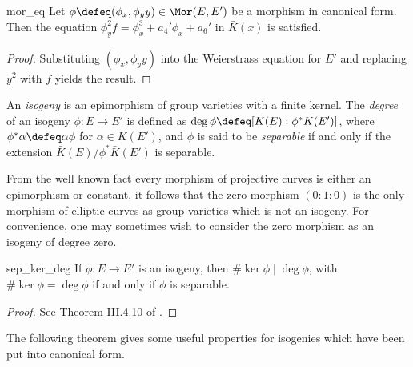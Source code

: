 \begin{lem}{}{mor_eq}
Let $\phi \defeq (\phi_x, \phi_y y) \in \Mor(E, E')$ be a morphism in canonical form. Then the equation $\phi_y^2 f = \phi_x^3 + a_4' \phi_x + a_6'$ in $\bar{K}(x)$ is satisfied.
\end{lem}
\begin{proof}
Substituting $(\phi_x, \phi_y y)$ into the Weierstrass equation for $E'$ and replacing $y^2$ with $f$ yields the result.
\end{proof}


\begin{dfn}{}{}
An \emph{isogeny} is an epimorphism of group varieties with a finite kernel. The \emph{degree} of an isogeny $\phi : E \to E'$ is defined as $\deg \phi \defeq [\bar{K}(E) : \phi^* \bar{K}(E')]$, where $\phi^*\alpha \defeq \alpha \phi$ for $\alpha \in \bar{K}(E')$, and $\phi$ is said to be \emph{separable} if and only if the extension $\bar{K}(E) / \phi^* \bar{K}(E')$ is separable.
\end{dfn}

From the well known fact every morphism of projective curves is either an epimorphism or constant, it follows that the zero morphism $(0 : 1 : 0)$ is the only morphism of elliptic curves as group varieties which is not an isogeny. For convenience, one may sometimes wish to consider the zero morphism as an isogeny of degree zero.

\begin{thm}{}{sep_ker_deg}
If $\phi : E \to E'$ is an isogeny, then $\#\ker \phi \mid \deg \phi$, with $\#\ker \phi = \deg \phi$ if and only if $\phi$ is separable.
\end{thm}
\begin{proof}
See Theorem III.4.10 of \citep{Silverman}.
\end{proof}

The following theorem gives some useful properties for isogenies which have been put into canonical form.

